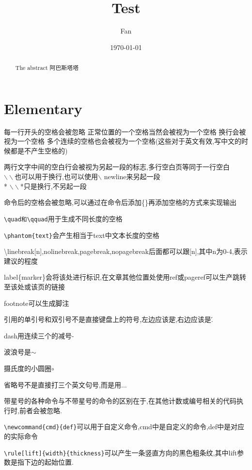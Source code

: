 \documentclass[a4paper,11pt]{article}%
\author{Fan}
\title{Test}
\date{\today}
\begin{document}
\maketitle
\tableofcontents
\begin{abstract}
    The abstract 阿巴斯塔塔
\end{abstract}
\pagestyle{plain}%
\section{Elementary}
 每一行开头的空格会被忽略 正常位置的一个空格当然会被视为一个空格
换行会被视为一个空格   多个连续的空格也会被视为一个空格(这些对于英文有效,写中文的时候都是不产生空格的)

两行文字中间的空白行会被视为另起一段的标志,多行空白页等同于一行空白\\
$\backslash\backslash$也可以用于换行,也可以使用\newline $\backslash$ newline来另起一段\\*
$\backslash\backslash$*只是换行,不另起一段

命令后的空格会被忽略,可以通过在命令后添加\{\}再添加空格的方式来实现输出

\verb+\quad和\qquad+用于生成不同长度的空格

\verb+\phantom{text}+会产生相当于text中文本长度的空格

\textbackslash linebreak[n],nolinebreak,pagebreak,nopagebreak后面都可以跟[n],其中n为0-4,表示建议的程度

label\{marker\}会将该处进行标识,在文章其他位置处使用ref或pageref可以生产跳转至该处或该页的链接

footnote可以生成脚注

引用的单引号和双引号不是直接键盘上的符号,左边应该是\`,右边应该是\'.

dash用连续三个的减号-

波浪号是$\sim$

摄氏度的小圆圈$\circ$

省略号不是直接打三个英文句号,而是用$\ldots$

带星号的各种命令与不带星号的命令的区别在于,在其他计数或编号相关的代码执行时,前者会被忽略.

\verb+\newcommand{cmd}{def}+可以用于自定义命令,cmd中是自定义的命令,def中是对应的实际命令

\verb|\rule[lift]{width}{thickness}|可以产生一条竖直方向的黑色粗条纹,其中lift参数是指下边的起始位置.
\end{document}
